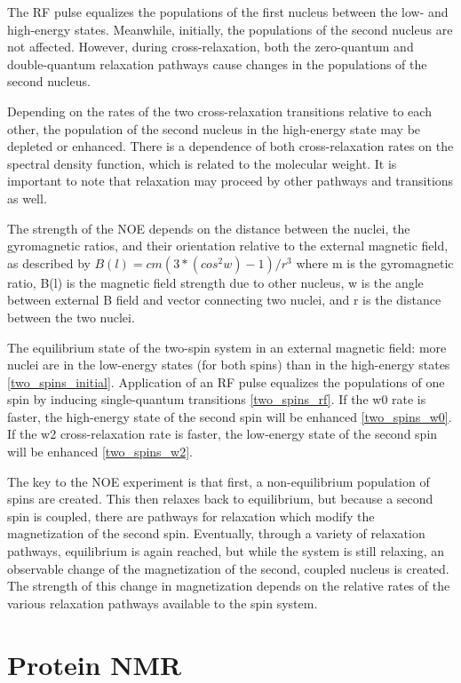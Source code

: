 The RF pulse equalizes the populations of the first nucleus between the low-
and high-energy states.  Meanwhile, initially, the populations of the second
nucleus are not affected.  However, during cross-relaxation, both the zero-quantum
and double-quantum relaxation pathways cause changes in the populations of
the second nucleus.

Depending on the rates of the two cross-relaxation transitions relative to 
each other, the population of the second nucleus in the high-energy state may 
be depleted or enhanced.  There is a dependence of both cross-relaxation
rates on the spectral density function, which is related to the molecular 
weight.  It is important to note that relaxation may proceed by other pathways
and transitions as well.

The strength of the NOE depends on the distance between the nuclei, 
the gyromagnetic ratios, and their orientation relative to the external 
magnetic field, as described by $B(l) = c m (3*(cos^2 w)-1) / r^3$
where 
m    is the gyromagnetic ratio,
B(l) is the magnetic field strength due to other nucleus,
w    is the angle between external B field and vector connecting two nuclei, and
r    is the distance between the two nuclei.

The equilibrium state of the two-spin system in an external magnetic field:
more nuclei are in the low-energy states (for both spins) than in the 
high-energy states \ref{two_spins_initial}.
Application of an RF pulse equalizes the populations of one spin by inducing
single-quantum transitions \ref{two_spins_rf}.
If the w0 rate is faster, the high-energy state of the second spin will be
enhanced \ref{two_spins_w0}.
If the w2 cross-relaxation rate is faster, the low-energy state of the second
spin will be enhanced \ref{two_spins_w2}.

The key to the NOE experiment is that first, a non-equilibrium population of
spins are created.  This then relaxes back to equilibrium, but because a 
second spin is coupled, there are pathways for relaxation which modify the
magnetization of the second spin.  Eventually, through a variety of relaxation
pathways, equilibrium is again reached,
but while the system is still relaxing, an observable change of the 
magnetization of the second, coupled nucleus is created.  The strength of
this change in magnetization depends on the relative rates of the various
relaxation pathways available to the spin system.



\section{Protein NMR}

